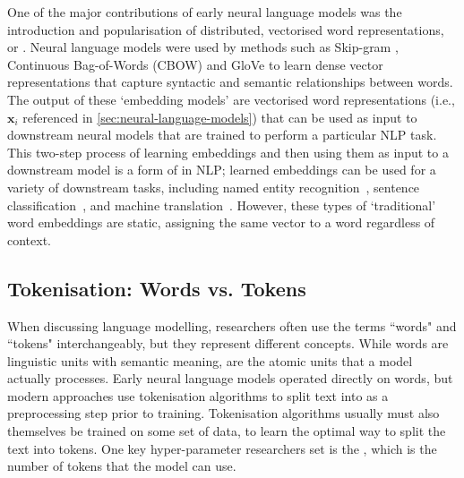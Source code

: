 One of the major contributions of early neural language models was the introduction and popularisation of distributed, vectorised word representations, or . Neural language models were used by methods such as Skip-gram \citep{mikolov2013efficient}, Continuous Bag-of-Words (CBOW) \citep{ mikolov2013distributed} and GloVe \citep{pennington2014glove} to learn dense vector representations that capture syntactic and semantic relationships between words. The output of these `embedding models' are vectorised word representations (i.e., $\mathbf{x}_i$ referenced in \cref{sec:neural-language-models}) that can be used as input to downstream neural models that are trained to perform a particular NLP task. This two-step process of learning embeddings and then using them as input to a downstream model is a form of  in NLP; learned embeddings can be used for a variety of downstream tasks, including named entity recognition~\citep{lample2016neural}, sentence classification~\citep{kim2014convolutional}, and machine translation~\citep{qi2018translation}. However, these types of `traditional' word embeddings are static, assigning the same vector to a word regardless of context.


\subsection{Tokenisation: Words vs. Tokens}
\label{sec:tokens-vs-words}

When discussing language modelling, researchers often use the terms ``words" and ``tokens" interchangeably, but they represent different concepts. While words are linguistic units with semantic meaning,  are the atomic units that a model actually processes. Early neural language models operated directly on words, but modern approaches use tokenisation algorithms to split text into  as a preprocessing step prior to training. Tokenisation algorithms usually must also themselves be trained on some set of data, to learn the optimal way to split the text into tokens. One key hyper-parameter researchers set is the , which is the number of tokens that the model can use.

